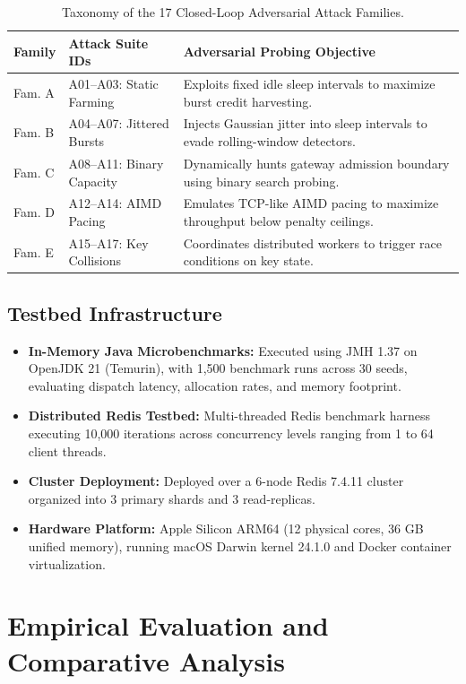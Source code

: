 \documentclass[conference]{IEEEtran}
\begin{document}
\begin{table}[t]
\centering
\caption{Taxonomy of the 17 Closed-Loop Adversarial Attack Families.}
\label{tab:attacks}
\begin{tabular}{llp{4.2cm}}
\toprule
\textbf{Family} & \textbf{Attack Suite IDs} & \textbf{Adversarial Probing Objective} \\
\midrule
Fam. A & A01--A03: Static Farming & Exploits fixed idle sleep intervals to maximize burst credit harvesting. \\
Fam. B & A04--A07: Jittered Bursts & Injects Gaussian jitter into sleep intervals to evade rolling-window detectors. \\
Fam. C & A08--A11: Binary Capacity & Dynamically hunts gateway admission boundary using binary search probing. \\
Fam. D & A12--A14: AIMD Pacing & Emulates TCP-like AIMD pacing to maximize throughput below penalty ceilings. \\
Fam. E & A15--A17: Key Collisions & Coordinates distributed workers to trigger race conditions on key state. \\
\bottomrule
\end{tabular}
\end{table}

\subsection{Testbed Infrastructure}
\begin{itemize}
    \item \textbf{In-Memory Java Microbenchmarks:} Executed using JMH 1.37 on OpenJDK 21 (Temurin), with 1,500 benchmark runs across 30 seeds, evaluating dispatch latency, allocation rates, and memory footprint.
    \item \textbf{Distributed Redis Testbed:} Multi-threaded Redis benchmark harness executing 10,000 iterations across concurrency levels ranging from 1 to 64 client threads.
    \item \textbf{Cluster Deployment:} Deployed over a 6-node Redis 7.4.11 cluster organized into 3 primary shards and 3 read-replicas.
    \item \textbf{Hardware Platform:} Apple Silicon ARM64 (12 physical cores, 36 GB unified memory), running macOS Darwin kernel 24.1.0 and Docker container virtualization.
\end{itemize}

\section{Empirical Evaluation and Comparative Analysis}
\end{document}
